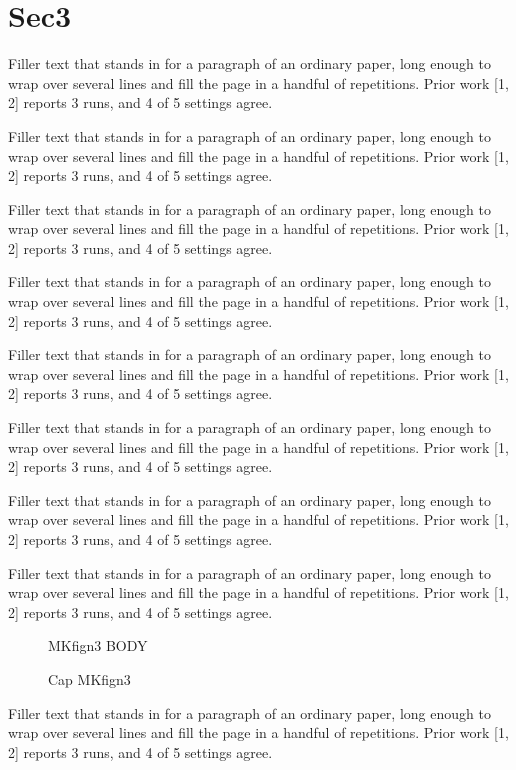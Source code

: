 \documentclass{article}
\begin{document}
\section{Sec3}
Filler text that stands in for a paragraph of an ordinary paper, long enough to wrap over several lines and fill the page in a handful of repetitions. Prior work [1, 2] reports 3 runs, and 4 of 5 settings agree.\par
Filler text that stands in for a paragraph of an ordinary paper, long enough to wrap over several lines and fill the page in a handful of repetitions. Prior work [1, 2] reports 3 runs, and 4 of 5 settings agree.\par
Filler text that stands in for a paragraph of an ordinary paper, long enough to wrap over several lines and fill the page in a handful of repetitions. Prior work [1, 2] reports 3 runs, and 4 of 5 settings agree.\par
Filler text that stands in for a paragraph of an ordinary paper, long enough to wrap over several lines and fill the page in a handful of repetitions. Prior work [1, 2] reports 3 runs, and 4 of 5 settings agree.\par
Filler text that stands in for a paragraph of an ordinary paper, long enough to wrap over several lines and fill the page in a handful of repetitions. Prior work [1, 2] reports 3 runs, and 4 of 5 settings agree.\par
Filler text that stands in for a paragraph of an ordinary paper, long enough to wrap over several lines and fill the page in a handful of repetitions. Prior work [1, 2] reports 3 runs, and 4 of 5 settings agree.\par
Filler text that stands in for a paragraph of an ordinary paper, long enough to wrap over several lines and fill the page in a handful of repetitions. Prior work [1, 2] reports 3 runs, and 4 of 5 settings agree.\par
Filler text that stands in for a paragraph of an ordinary paper, long enough to wrap over several lines and fill the page in a handful of repetitions. Prior work [1, 2] reports 3 runs, and 4 of 5 settings agree.\par
\begin{figure}[t]\centering MKfign3 BODY\caption{Cap MKfign3}\label{fig:n3}\end{figure}
Filler text that stands in for a paragraph of an ordinary paper, long enough to wrap over several lines and fill the page in a handful of repetitions. Prior work [1, 2] reports 3 runs, and 4 of 5 settings agree.\par
\end{document}
